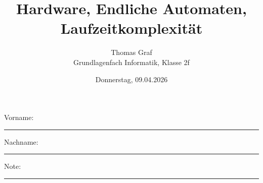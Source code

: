 \newtoggle{withbonus} \toggletrue{withbonus} %

\newcommand{\mycourse}{Grundlagenfach Informatik}
\newcommand{\myclass}{Klasse 2f}
\newcommand{\mydate}{Donnerstag, 09.04.2026}

\title{\textbf{Hardware, Endliche Automaten, Laufzeitkomplexität}}
\author{Thomas Graf\\
	\mycourse, \myclass}
\date{\mydate}
\maketitle
\thispagestyle{headandfoot}

\begin{center}
\end{center}
\vspace{10mm}

\begin{center}
	Vorname: \rule{45mm}{0.8pt}\qquad Nachname: \rule{45mm}{0.8pt}
\end{center}
\vspace{20mm}

\begin{center}
	\iftoggle{withbonus} {
		\combinedgradetable[h][questions]
	} {
		\gradetable[h][questions]
	}
\end{center}
\vspace{15mm}
\begin{center}
	Note:
	\vspace{10mm}

	\rule{8mm}{1.2pt}
\end{center}
\clearpage

